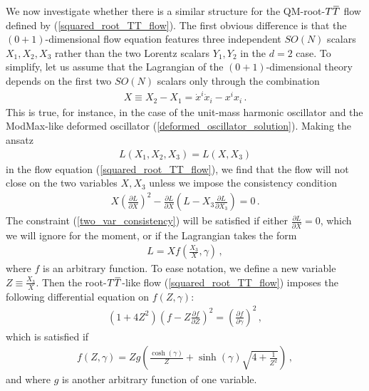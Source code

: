 \documentclass[12pt]{article}
\numberwithin{equation}{section}
\newcommand{\overbar}[1]{\mkern 1.5mu\overline{\mkern-1.5mu#1\mkern-1.5mu}\mkern 1.5mu}
\def\TT{{T\overbar{T}}}
\begin{document}
We now investigate whether there is a similar structure for the QM-root-$\TT$ flow defined by (\ref{squared_root_TT_flow}). The first obvious difference is that the $(0+1)$-dimensional flow equation features three independent $SO(N)$ scalars $X_1, X_2, X_3$ rather than the two Lorentz scalars $Y_1, Y_2$ in the $d = 2$ case. To simplify, let us assume that the Lagrangian of the $(0+1)$-dimensional theory depends on the first two $SO(N)$ scalars only through the combination
%
\begin{align}
    X \equiv X_2 - X_1 = \dot{x}^i \dot{x}_i - x^i x_i \, .
\end{align}
%
This is true, for instance, in the case of the unit-mass harmonic oscillator and the ModMax-like deformed oscillator (\ref{deformed_oscillator_solution}). Making the ansatz
%
\begin{align}
    L ( X_1, X_2, X_3 ) = L ( X, X_3 )
\end{align}
%
in the flow equation (\ref{squared_root_TT_flow}), we find that the flow will not close on the two variables $X, X_3$ unless we impose the consistency condition
%
\begin{align}\label{two_var_consistency}
    X \left( \frac{\partial L}{\partial X} \right)^2 - \frac{\partial L}{\partial X} \left( L - X_3 \frac{\partial L}{\partial X_3} \right) = 0 \, .
\end{align}
%
The constraint (\ref{two_var_consistency}) will be satisfied if either $\frac{\partial L}{\partial X} = 0$, which we will ignore for the moment, or if the Lagrangian takes the form
%
\begin{align}
    L = X f \left( \frac{X_3}{X} , \gamma \right) \, , 
\end{align}
%
where $f$ is an arbitrary function. To ease notation, we define a new variable $Z \equiv \frac{X_3}{X}$. Then the root-$\TT$-like flow (\ref{squared_root_TT_flow}) imposes the following differential equation on $f ( Z, \gamma )$:
%
\begin{align}
    \left( 1 + 4 Z^2 \right) \left( f  - Z \frac{\partial f}{\partial Z} \right)^2 = \left( \frac{\partial f}{\partial \gamma} \right)^2 \, , 
\end{align}
%
which is satisfied if
%
\begin{align}
    f ( Z , \gamma ) = Z g \left( \frac{\cosh ( \gamma )}{Z} + \sinh ( \gamma ) \sqrt{ 4 + \frac{1}{Z^2} } \right) \, , 
\end{align}
%
and where $g$ is another arbitrary function of one variable.
\end{document}
